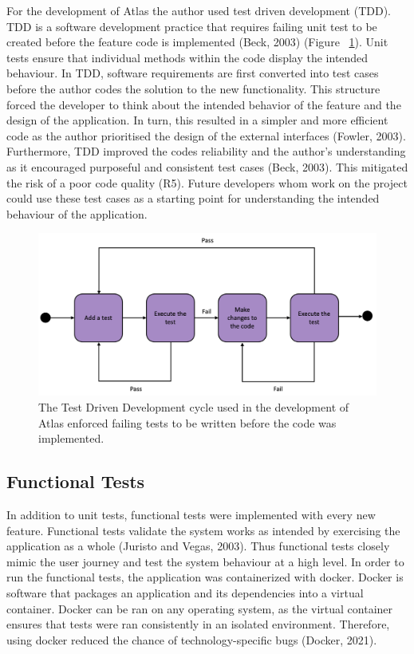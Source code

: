 \documentclass{article}
\begin{document}
For the development of Atlas the author used test driven development (TDD). TDD is a software development practice that requires failing unit test to be created before the feature code is implemented (Beck, 2003) (Figure ~\ref{fig:tdd}). Unit tests ensure that individual methods within the code display the intended behaviour. In TDD, software requirements are first converted into test cases before the author codes the solution to the new functionality. This structure forced the developer to think about the intended behavior of the feature and the design of the application. In turn, this resulted in a simpler and more efficient code as the author prioritised the design of the external interfaces (Fowler, 2003). Furthermore, TDD improved the codes reliability and the author's understanding as it encouraged purposeful and consistent test cases (Beck, 2003). This mitigated the risk of a poor code quality (R5). Future developers whom work on the project could use these test cases as a starting point for understanding the intended behaviour of the application.

\begin{figure}[!htb]
  \centering
      \includegraphics[width=1\textwidth]{images/tdd.png}
  \caption{The Test Driven Development cycle used in the development of Atlas enforced failing tests to be written before the code was implemented.}
  \label{fig:tdd}
\end{figure}

\subsection{Functional Tests}

In addition to unit tests, functional tests were implemented with every new feature. Functional tests validate the system works as intended by exercising the application as a whole (Juristo and Vegas,  2003). Thus functional tests closely mimic the user journey and test the system behaviour at a high level. In order to run the functional tests, the application was containerized with docker. Docker is software that packages an application and its dependencies into a virtual container. Docker can be ran on any operating system, as the virtual container ensures that tests were ran consistently in an isolated environment. Therefore, using docker reduced the chance of technology-specific bugs (Docker, 2021). 
\end{document}
